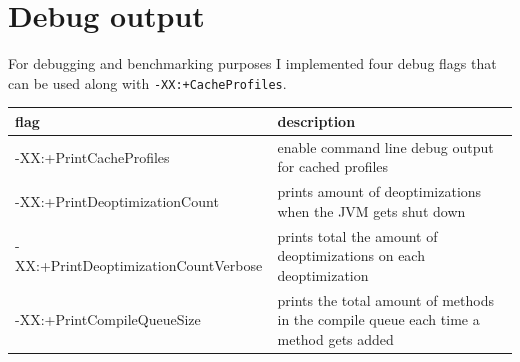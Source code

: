 \section{Debug output}
\label{s:debugoutput}
For debugging and benchmarking purposes I implemented four debug flags that can be used along with \texttt{-XX:+CacheProfiles}.
\begin{table}[ht]
  \centering
  \label{t:debugflags}
  \begin{center}
    \begin{tabular}{| l | p{9.0cm} |}
       \hline
       \textbf{flag} & \textbf{description} \\ \hline\hline
       -XX:+PrintCacheProfiles & enable command line debug output for cached profiles\\ \hline
       -XX:+PrintDeoptimizationCount & prints amount of deoptimizations when the JVM gets shut down\\ \hline
       -XX:+PrintDeoptimizationCountVerbose & prints total the amount of deoptimizations on each deoptimization\\ \hline
       -XX:+PrintCompileQueueSize & prints the total amount of methods in the compile queue each time a method gets added \\ \hline
    \end{tabular}
  \end{center}
\end{table}

 
